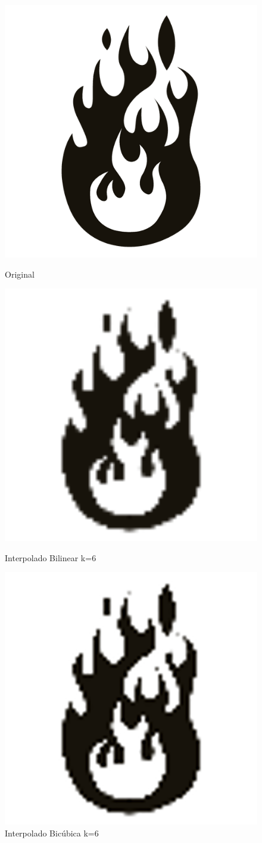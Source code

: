\documentclass[12pt]{article}
\begin{document}
\begin{figure}[H]
  \centering
  \begin{minipage}{.5\textwidth}
    \centering
    \includegraphics[width=.4\linewidth]{imagens/img_fogo/fogo.png}
    \caption{Original}
  \end{minipage}
  \begin{minipage}{.5\linewidth}
  \end{minipage}
  \begin{minipage}{.5\textwidth}
    \centering
    \includegraphics[width=.4\linewidth]{imagens/img_fogo/fogo_1_6_1.png}
    \caption{Interpolado Bilinear k=6}
  \end{minipage}%
  \begin{minipage}{.5\textwidth}
    \centering
    \includegraphics[width=.4\linewidth]{imagens/img_fogo/fogo_2_6_1.png}
    \caption{Interpolado Bicúbica k=6}
  \end{minipage}
\end{figure}
\end{document}
